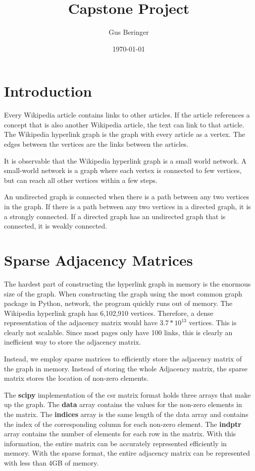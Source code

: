 \documentclass{article}
\author{Gus Beringer}
\title{Capstone Project}
\date{\today}
\begin{document}
\maketitle

\section{Introduction}

Every Wikipedia article contains links to other articles. If the article references a concept that is also another Wikipedia article, the text can link to that article.
The Wikipedia hyperlink graph is the graph with every article as a vertex. The edges between the vertices are the links between the articles.

It is observable that the Wikipedia hyperlink graph is a small world network.
A small-world network is a graph where each vertex is connected to few vertices, but can reach all other vertices within a few steps.

An undirected graph is connected when there is a path between any two vertices in the graph.
If there is a path between any two vertices in a directed graph, it is a strongly connected.
If a directed graph has an undirected graph that is connected, it is weakly connected.


\section{Sparse Adjacency Matrices}

The hardest part of constructing the hyperlink graph in memory is the enormous size of the graph. When constructing the graph using the most common graph package in Python, network, the program quickly runs out of memory. The Wikipedia hyperlink graph has 6,102,910 %
vertices.
Therefore, a dense representation of the adjacency matrix would have $3.7 * 10^{13}$ vertices. This is clearly not scalable. Since most pages only have 100
links, this is clearly an inefficient way to store the adjacency matrix.

Instead, we employ sparse matrices to efficiently store the adjacency matrix of the graph in memory. Instead of storing the whole Adjacency matrix, the sparse matrix stores the location of non-zero elements.

The \textbf{scipy} implementation of the csr matrix format holds three arrays that make up the graph. The \textbf{data} array contains the values for the non-zero elements in the matrix. The \textbf{indices} array is the same length of the data array and contains the index of the corresponding column for each non-zero element. The \textbf{indptr} array contains the number of elements for each row in the matrix. With this information, the entire matrix can be accurately represented efficiently in memory. With the sparse format, the entire adjacency matrix can be represented with less than 4GB of memory.
\end{document}
